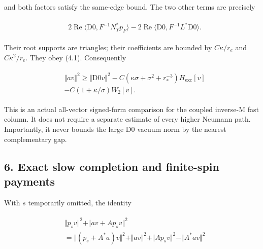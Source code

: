 and both factors satisfy the same-edge bound. The two other terms are
precisely

\begin{gather*}
\begin{aligned}
& 2\operatorname{Re} \langle \mathrm{D0},F^{-1}N_{Y}^{*}p_{F}\rangle -2\operatorname{Re} \langle \mathrm{D0},F^{-1}L^{*}\mathrm{D0}\rangle .
\end{aligned}\tag{5.4}
\end{gather*}

Their root supports are triangles; their coefficients are bounded by
\(C \kappa  /r_{e}\) and \(C \kappa ^{2}/r_{e}\). They obey (4.1).
Consequently

\begin{gather*}
\begin{aligned}
& \Vert av\Vert ^{2}\ge \Vert \mathrm{D0}v\Vert ^{2}-C( \kappa  \sigma  + \sigma ^{2}+r_{*}^{-3})H_{\mathrm{exc}}[v] \\
& -C(1+ \kappa  / \sigma  )W_{2}[v].
\end{aligned}\tag{5.5}
\end{gather*}

This is an actual all-vector signed-form comparison for the coupled
inverse-M fast column. It does not require a separate estimate of every
higher Neumann path. Importantly, it never bounds the large
\(\mathrm{D0}\) vacuum norm by the nearest complementary gap.

\subsection{6. Exact slow completion and finite-spin
payments}\label{h-exact-slow-completion-and-finite-spin-payments}

With \(s\) temporarily omitted, the identity

\begin{gather*}
\begin{aligned}
& \Vert p_{s} v\Vert ^{2}+\Vert a v+A p_{s} v\Vert ^{2} \\
& =\Vert (p_{s}+A^{*}a)v\Vert ^{2}+\Vert av\Vert ^{2}+\Vert A p_{s} v\Vert ^{2}-\Vert A^{*}a v\Vert ^{2}
\end{aligned}\tag{6.1}
\end{gather*}

